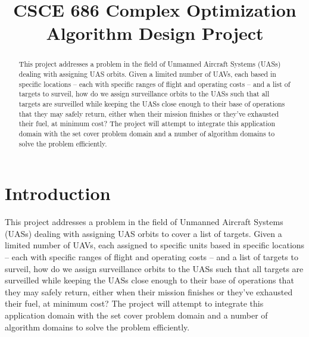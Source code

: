 \documentclass[conference]{IEEEtran}
\begin{document}
 \title{CSCE 686 Complex Optimization\\Algorithm Design Project}

\author{
        }
\maketitle

\begin{abstract}
This project addresses a problem in the field of Unmanned Aircraft Systems
(UASs) dealing with assigning UAS orbits.  Given a limited number of UAVs, each
based in specific locations -- each with specific ranges of flight and
operating costs -- and a list of targets to surveil, how do we assign
surveillance orbits to the UASs such that all targets are surveilled while
keeping the UASs close enough to their base of operations that they may safely
return, either when their mission finishes or they've exhausted their fuel, at
minimum cost? The project will attempt to integrate this application domain
with the set cover problem domain and a number of algorithm domains to solve
the problem efficiently.
\end{abstract}

\section{Introduction} \label{intro}


This project addresses a problem in the field of Unmanned Aircraft Systems
(UASs) dealing with assigning UAS orbits to cover a list of targets.  Given a
limited number of UAVs, each assigned to specific units based in specific
locations -- each with specific ranges of flight and operating costs -- and a
list of targets to surveil, how do we assign surveillance orbits to the UASs
such that all targets are surveilled while keeping the UASs close enough to
their base of operations that they may safely return, either when their mission
finishes or they've exhausted their fuel, at minimum cost? The project will
attempt to integrate this application domain with the set cover problem domain
and a number of algorithm domains to solve the problem efficiently.
\end{document}
